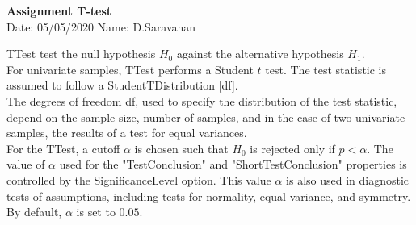 \documentclass[a4paper,11pt,openright]{report}
\begin{document}
\singlespacing
\pagestyle{plain}

\begin{center}
\textbf{Assignment T-test} \\
Date: 05/05/2020 \hspace{2mm} Name: D.Saravanan
\end{center}

\vspace{10px}

TTest test the null hypothesis $H_{0}$ against the alternative hypothesis $H_{1}$. \\

For univariate samples, TTest performs a Student $t$ test. The test statistic is assumed to
follow a StudentTDistribution [df]. \\ 

The degrees of freedom df, used to specify the distribution of the test statistic, depend on
the sample size, number of samples, and in the case of two univariate samples, the results 
of a test for equal variances. \\ 

For the TTest, a cutoff $\alpha$ is chosen such that $H_{0}$ is rejected only if $p < \alpha
$. The value of $\alpha$ used for the "TestConclusion" and "ShortTestConclusion" properties 
is controlled by the SignificanceLevel option. This value $\alpha$ is also used in diagnostic
tests of assumptions, including tests for normality, equal variance, and symmetry. By 
default, $\alpha$ is set to $0.05$. 
\end{document}
